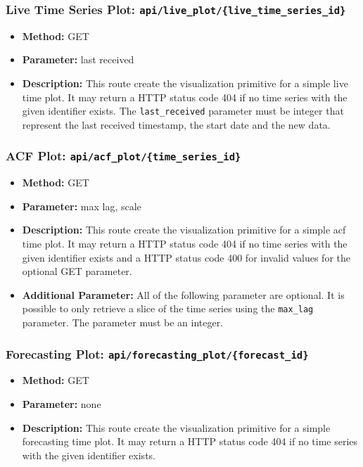 \documentclass[11pt, a4paper]{article}
\begin{document}
\subsubsection*{Live Time Series Plot: \texttt{api/live\_plot/\{live\_time\_series\_id\}}}
\begin{itemize}
 \item[] \textbf{Method:} GET 
 \item[] \textbf{Parameter:} last received
 \item[] \textbf{Description:} This route create the visualization primitive for a simple live time plot.
 It may return a HTTP status code 404 if no time series with the given identifier exists.
 The \texttt{last\_received} parameter must be integer that represent the last received timestamp, the start date and the new data.
\end{itemize}

\subsubsection*{ACF Plot: \texttt{api/acf\_plot/\{time\_series\_id\}}}
\begin{itemize}
 \item[] \textbf{Method:} GET 
 \item[] \textbf{Parameter:} max lag, scale
 \item[] \textbf{Description:} This route create the visualization primitive for a simple acf time plot.
 It may return a HTTP status code 404 if no time series with the given identifier exists and a HTTP status code 400 for invalid values for the optional GET parameter.
 \item[] \textbf{Additional Parameter:} All of the following parameter are optional.
 It is possible to only retrieve a slice of the time series using the \texttt{max\_lag} parameter. The parameter must be an integer.
\end{itemize}

\subsubsection*{Forecasting Plot: \texttt{api/forecasting\_plot/\{forecast\_id\}}}
\begin{itemize}
 \item[] \textbf{Method:} GET 
 \item[] \textbf{Parameter:} none
 \item[] \textbf{Description:} This route create the visualization primitive for a simple forecasting time plot.
 It may return a HTTP status code 404 if no time series with the given identifier exists.
\end{itemize}
\end{document}
